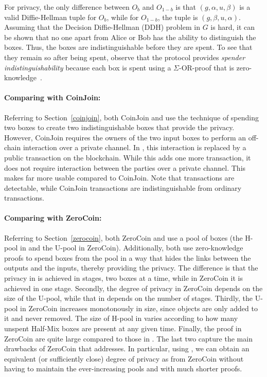 \documentclass[11pt]{article}
\begin{document}
For privacy, the only difference between $O_b$ and $O_{1-b}$ is that $(g, \alpha, u, \beta)$ is a valid Diffie-Hellman tuple for $O_b$, while for $O_{1-b}$, the tuple is $(g, \beta, u, \alpha)$. Assuming that the Decision Diffie-Hellman (DDH) problem in $G$ is hard, it can be shown that no one apart from Alice or Bob has the ability to distinguish the boxes.
Thus, the boxes are indistinguishable before they are spent. To see that they remain so after being spent, observe that the protocol provides {\em spender indistinguishability} because each box is spent using a $\Sigma$-OR-proof that is zero-knowledge~\cite{Dam10}. 

\paragraph{Comparing with CoinJoin:} Referring to Section~\ref{coinjoin}, both CoinJoin and \algname use the technique of spending two boxes to create two indistinguishable boxes that provide the privacy. However, CoinJoin requires the owners of the two input boxes to perform an off-chain interaction over a private channel. In \algname, this interaction is replaced by a public transaction on the blockchain. While this adds one more transaction, it does not require interaction between the parties over a private channel. This makes \algname far more usable compared to CoinJoin. Note that \algname transactions are detectable, while CoinJoin transactions are indistinguishable from ordinary transactions.

\paragraph{Comparing with ZeroCoin:} Referring to Section~\ref{zerocoin}, both ZeroCoin and \algname use a pool of boxes (the H-pool in \algname and the U-pool in ZeroCoin). Additionally, both use zero-knowledge proofs to spend boxes from the pool in a way that hides the links between the outputs and the inputs, thereby providing the privacy. 
The difference is that the privacy in \algname is achieved in stages, two boxes at a time, while in ZeroCoin it is achieved in one stage. Secondly, the degree of privacy in ZeroCoin depends on the size of the U-pool, while that in \algname depends on the number of stages. Thirdly, the U-pool in ZeroCoin increases monotonously in size, since objects are only added to it and never removed. The size of H-pool in \algname varies according to how many unspent Half-Mix boxes are present at any given time. Finally, the proof in ZeroCoin are quite large compared to those in \algname. The last two capture the main drawbacks of ZeroCoin that \algname addresses.
In particular, using \algname, we can obtain an equivalent (or sufficiently close) degree of privacy as from ZeroCoin without having to maintain the ever-increasing pools and with much shorter proofs. 
\end{document}
